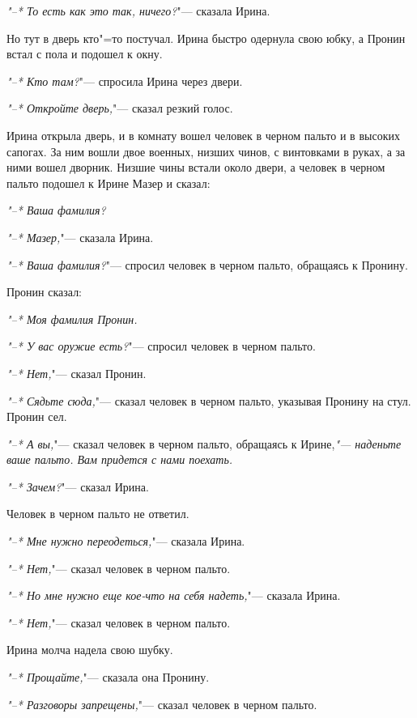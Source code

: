 \textsl{"--* То есть как это так, ничего?}"---  
    сказала Ирина.
    
    Но тут в дверь  кто"=то  постучал. Ирина
быстро одернула свою юбку, а Пронин встал  с
пола и подошел к окну.

\textsl{"--* Кто там?}"---  спросила Ирина через  
    двери.
    
\textsl{"--* Откройте дверь,}"---  сказал резкий голос.
    
    Ирина  открыла дверь, и в комнату вошел
человек в черном пальто и в высоких сапогах.
За ним  вошли двое военных,  низших чинов, с
винтовками в руках, а за ними вошел дворник.
Низшие чины встали около двери, а человек  в
черном  пальто  подошел к Ирине Мазер и 
сказал:

\textsl{"--* Ваша фамилия?}
    
\textsl{"--* Мазер,}"---  сказала Ирина.
    
\textsl{"--* Ваша фамилия?}"--- спросил  человек  в
черном пальто, обращаясь к Пронину.

    Пронин сказал:
    
\textsl{"--* Моя фамилия Пронин.}
    
\textsl{"--* У вас оружие есть?}"---  спросил  человек
в черном пальто.

\textsl{"--* Нет,}"---  сказал Пронин.
    
\textsl{"--* Сядьте сюда,}"---  сказал человек в  
    черном пальто, указывая Пронину на стул.
    Пронин сел.
     
\textsl{"--* А вы,}"---  сказал человек в черном 
    пальто, обращаясь к Ирине,\textsl{"--- наденьте ваше 
    пальто. Вам придется с нами поехать.}
    
\textsl{"--* Зачем?}"---  сказал Ирина.
    
    Человек в черном пальто не ответил.
    
\textsl{"--* Мне нужно переодеться,}"---  сказала 
    Ирина.
    
\textsl{"--* Нет,}"---  сказал человек в черном 
    пальто.
    
\textsl{"--* Но мне нужно  еще кое-что на себя 
    надеть,}"---  сказала Ирина.
    
\textsl{"--* Нет,}"---   сказал человек в черном 
    пальто.
    
    Ирина молча надела свою шубку.
    
\textsl{"--* Прощайте,}"---  сказала она Пронину.
    
\textsl{"--* Разговоры запрещены,}"---  сказал человек
в черном пальто.

